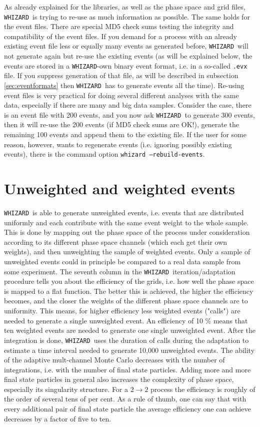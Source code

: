 \documentclass[12pt]{book}
\newcommand{\ttt}[1]{\texttt{#1}}
\newcommand{\whizard}{\texttt{WHIZARD}}
\begin{document}
As already explained for the libraries, as well as the phase space and
grid files, \whizard\ is trying to re-use as much information as
possible. The same holds for the event files. There are special MD5
check sums testing the integrity and compatibility of the event
files. If you demand for a process with an already existing event file
less or equally many events as generated before, \whizard\ will not
generate again but re-use the existing events (as will be explained
below, the events are stored in a \whizard-own binary event format,
i.e. in a so-called \ttt{.evx} file. If you suppress generation of
that file, as will be described in subsection \ref{sec:eventformats}
then \whizard\ has to generate events all the time). Re-using event
files is very practical for doing several different analyses with the
same data, especially if there are many and big data samples. Consider
the case, there is an event file with 200 events, and you now ask
\whizard\ to generate 300 events, then it will re-use the 200 events
(if MD5 check sums are OK!), generate the remaining 100 events and
append them to the existing file. If the user for some reason,
however, wants to regenerate events (i.e. ignoring possibly existing
events), there is the command option \ttt{whizard --rebuild-events}.


\section{Unweighted and weighted events}

\whizard\ is able to generate unweighted events, i.e. events that are
distributed uniformly and each contribute with the same event weight
to the whole sample. This is done by mapping out the phase space of
the process under consideration according to its different phase space
channels (which each get their own weights), and then unweighting the 
sample of weighted events. Only a sample of unweighted events could in
principle be compared to a real data sample from some experiment. The
seventh column in the \whizard\ iteration/adaptation procedure tells you
about the efficiency of the grids, i.e. how well the phase space is
mapped to a flat function. The better this is achieved, the higher the
efficiency becomes, and the closer the weights of the different phase
space channels are to uniformity. This means, for higher efficiency
less weighted events ("calls") are needed to generate a single
unweighted event. An efficiency of 10 \% means that ten weighted
events are needed to generate one single unweighted event. After the
integration is done, \whizard\ uses the duration of calls during the
adaptation to estimate a time interval needed to generate 10,000
unweighted events. The ability of the adaptive mult-channel Monte
Carlo decreases with the number of integrations, i.e. with the number
of final state particles. Adding more and more final state particles
in general also increases the complexity of phase space, especially
its singularity structure. For a $2 \to 2$ process the efficiency is
roughly of the order of several tens of per cent. As a rule of thumb,
one can say that with every additional pair of final state particle
the average efficiency one can achieve decreases by a factor of five
to ten. 
\end{document}
